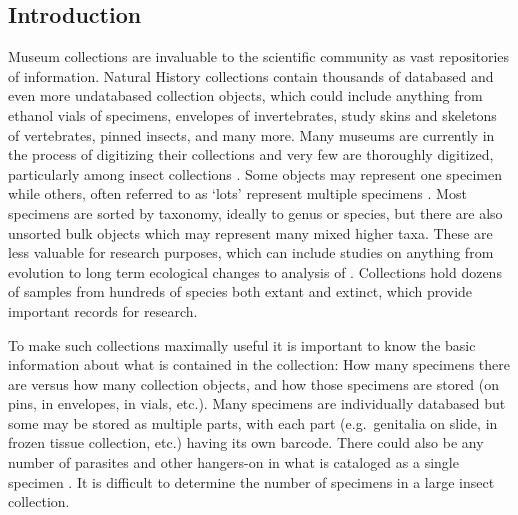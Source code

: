 \vspace{4mm}

\begin{multicols}{2}

\section{Introduction} 

Museum collections are invaluable to the scientific community as vast repositories of information. Natural History collections contain thousands of databased and even more undatabased collection objects, which could include anything from ethanol vials of specimens, envelopes of invertebrates, study skins and skeletons of vertebrates, pinned insects, and many more. Many museums are currently in the process of digitizing their collections and very few are thoroughly digitized, particularly among insect collections \citep{Sikesetal2016}. Some objects may represent one specimen while others, often referred to as ‘lots’ represent multiple specimens \citep{Sikes2015}. Most specimens are sorted by taxonomy, ideally to genus or species, but there are also unsorted bulk objects which may represent many mixed higher taxa. These are less valuable for research purposes, which can include studies on anything from evolution to long term ecological changes \citep{MunozPrice2019} to analysis of  \citep{vanderValketal2017}. Collections hold dozens of samples from hundreds of species both extant and extinct, which provide important records for research. 

To make such collections maximally useful it is important to know the basic information about what is contained in the collection: How many specimens there are versus how many collection objects, and how those specimens are stored (on pins, in envelopes, in vials, etc.). Many specimens are individually databased but some may be stored as multiple parts, with each part (e.g.\ genitalia on slide,  in frozen tissue collection, etc.) having its own barcode. There could also be any number of parasites and other hangers-on in what is cataloged as a single specimen \citep{Welickyetal2019, Sikes2015}. It is difficult to determine the number of specimens in a large insect collection. 
	

\end{multicols}
